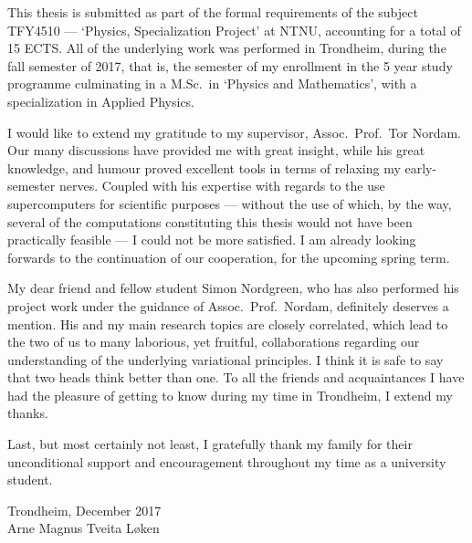This thesis is submitted as part of the formal requirements of the subject
TFY4510 --- `Physics, Specialization Project' at NTNU, accounting for a total
of 15 ECTS. All of the underlying work was performed in Trondheim, during the
fall semester of 2017, that is, the  semester of my enrollment in the
5 year study programme culminating in a M.Sc.\ in `Physics and Mathematics',
with a specialization in Applied Physics.

I would like to extend my gratitude to my supervisor, Assoc.\ Prof.\
Tor Nordam. Our many discussions have provided me with great insight, while
his great knowledge, and humour proved excellent tools in terms
of relaxing my early-semester nerves.
Coupled with his expertise with regards to the use supercomputers for scientific
purposes --- without the use of which, by the
way, several of the computations constituting this thesis would not have been
practically feasible --- I could not be more satisfied. I am already looking
forwards to the continuation of our cooperation, for the upcoming spring term.

My dear friend and fellow student Simon Nordgreen, who has also performed his
project work under the guidance of Assoc.\ Prof.\ Nordam, definitely
deserves a mention. His and my main research topics are closely correlated,
which lead to the two of us to many laborious, yet fruitful, collaborations
regarding our understanding of the underlying variational principles. I think it
is safe to say that two heads think better than one. To all the friends and
acquaintances I have had the pleasure of getting to know during my
time in Trondheim, I extend my thanks.

Last, but most certainly not least, I gratefully thank my family for their
unconditional support and encouragement throughout my time as a university
student.


\begin{minipage}[t]{\textwidth}
    \begin{flushright}
    Trondheim, December 2017\\
    Arne Magnus Tveita Løken
    \end{flushright}
\end{minipage}\\[2cm]


